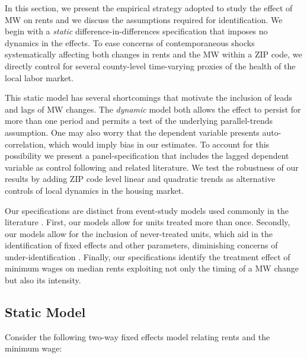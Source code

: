 
In this section, we present the empirical strategy adopted to study the effect of MW 
on rents and we discuss the assumptions required for identification. We begin with a 
\textit{static} difference-in-differences specification that imposes no dynamics in 
the effects. To ease concerns of contemporaneous shocks systematically affecting both 
changes in rents and the MW within a ZIP code, we directly control for several 
county-level time-varying proxies of the health of the local labor market.

This static model has several shortcomings that motivate the inclusion of leads and 
lags of MW changes. The \textit{dynamic} model both allows the effect to persist for 
more than one period and permits a test of the underlying parallel-trends assumption. 
One may also worry that the dependent variable presents auto-correlation, which would 
imply bias in our estimates. To account for this possibility we present a 
panel-specification that includes the lagged dependent variable as control following 
\textcite{ArellanoBond1991} and related literature. We test the robustness of our 
results by adding ZIP code level linear and quadratic trends as alternative controls 
of local dynamics in the housing market. 

Our specifications are distinct from event-study models used commonly in the 
literature \parencite[discussed in, e.g.,][]{BorusyakJaravel2017, abraham2018}. 
First, our models allow for units treated more than once. Secondly, our models allow 
for the inclusion of never-treated units, which aid in the identification of fixed 
effects and other parameters, diminishing concerns of under-identification 
\parencite{BorusyakJaravel2017}. Finally, our specifications identify the treatment 
effect of minimum wages on median rents exploiting not only the timing of a MW change 
but also its intensity.
    
\subsection{Static Model}
Consider the following two-way fixed effects model relating rents and the minimum wage:

